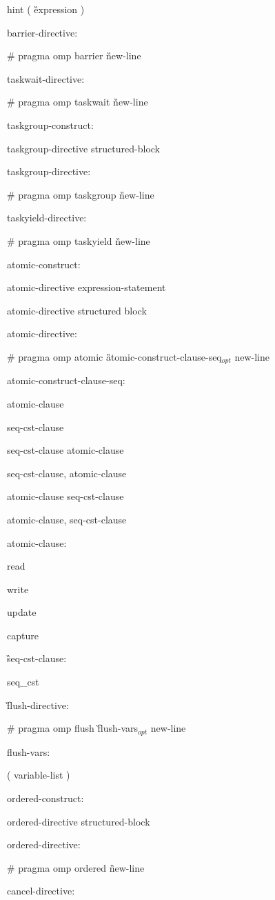 {\C\I hint ( \G expression \C )

barrier-directive:

\C\I \# pragma omp barrier \G new-line

taskwait-directive:

\C\I \# pragma omp taskwait \G new-line

taskgroup-construct:

\I taskgroup-directive structured-block

taskgroup-directive:

\C\I \# pragma omp taskgroup \G new-line

taskyield-directive:

\C\I \# pragma omp taskyield \G new-line

atomic-construct:

\I atomic-directive expression-statement

\I atomic-directive structured block

atomic-directive:

\C\I \# pragma omp atomic \G atomic-construct-clause-seq$_{opt}$ new-line

atomic-construct-clause-seq:

\I atomic-clause

\I seq-cst-clause

\I seq-cst-clause atomic-clause

\I seq-cst-clause, atomic-clause

\I atomic-clause seq-cst-clause 

\I atomic-clause, seq-cst-clause 

atomic-clause:

\C\I read

\I write

\I update

\I capture

\G seq-cst-clause:

\C\I seq\_cst

\G flush-directive:

\C\I \# pragma omp flush \G flush-vars$_{opt}$ new-line

flush-vars:

\I ( variable-list )

ordered-construct:

\I ordered-directive structured-block

ordered-directive:

\C\I \# pragma omp ordered \G new-line

cancel-directive:

}
